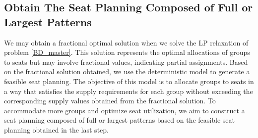 \subsection{Obtain The Seat Planning Composed of Full or Largest Patterns}\label{seat_assignment}
We may obtain a fractional optimal solution when we solve the LP relaxation of problem \eqref{BD_master}. This solution represents the optimal allocations of groups to seats but may involve fractional values, indicating partial assignments. Based on the fractional solution obtained, we use the deterministic model to generate a feasible seat planning. The objective of this model is to allocate groups to seats in a way that satisfies the supply requirements for each group without exceeding the corresponding supply values obtained from the fractional solution. To accommodate more groups and optimize seat utilization, we aim to construct a seat planning composed of full or largest patterns based on the feasible seat planning obtained in the last step. 







